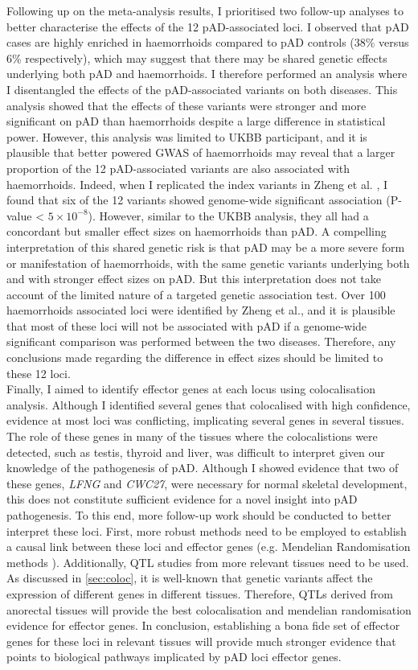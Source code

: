 Following up on the meta-analysis results, I prioritised two follow-up analyses to better characterise the effects of the 12 pAD-associated loci. I observed that pAD cases are highly enriched in haemorrhoids compared to pAD controls (38\% versus 6\% respectively), which may suggest that there may be shared genetic effects underlying both pAD and haemorrhoids. I therefore performed an analysis where I disentangled the effects of the pAD-associated variants on both diseases. This analysis showed that the effects of these variants were stronger and more significant on pAD than haemorrhoids despite a large difference in statistical power. However, this analysis was limited to UKBB participant, and it is plausible that better powered GWAS of haemorrhoids may reveal that a larger proportion of the 12 pAD-associated variants are also associated with haemorrhoids. Indeed, when I replicated the index variants in Zheng et al. \cite{Zheng2021-ss}, I found that six of the 12 variants showed genome-wide significant association (P-value < $5\times10^{-8}$). However, similar to the UKBB analysis, they all had a concordant but smaller effect sizes on haemorrhoids than pAD. A compelling interpretation of this shared genetic risk is that pAD may be a more severe form or manifestation of haemorrhoids, with the same genetic variants underlying both and with stronger effect sizes on pAD. But this interpretation does not take account of the limited nature of a targeted genetic association test. Over 100 haemorrhoids associated loci were identified by Zheng et al., and it is plausible that most of these loci will not be associated with pAD if a genome-wide significant comparison was performed between the two diseases. Therefore, any conclusions made regarding the difference in effect sizes should be limited to these 12 loci.\\

Finally, I aimed to identify effector genes at each locus using colocalisation analysis. Although I identified several genes that colocalised with high confidence, evidence at most loci was conflicting, implicating several genes in several tissues. The role of these genes in many of the tissues where the colocalistions were detected, such as testis, thyroid and liver, was difficult to interpret given our knowledge of the pathogenesis of pAD. Although I showed evidence that two of these genes, \textit{LFNG} and \textit{CWC27}, were necessary for normal skeletal development, this does not constitute sufficient evidence for a novel insight into pAD pathogenesis. To this end, more follow-up work should be conducted to better interpret these loci. First, more robust methods need to be employed to establish a causal link between these loci and effector genes (e.g. Mendelian Randomisation methods \cite{Sanderson2022-nm}). Additionally, QTL studies from more relevant tissues need to be used. As discussed in \ref{sec:coloc}, it is well-known that genetic variants affect the expression of different genes in different tissues. Therefore, QTLs derived from anorectal tissues will provide the best colocalisation and mendelian randomisation evidence for effector genes. In conclusion, establishing a bona fide set of effector genes for these loci in relevant tissues will provide much stronger evidence that points to biological pathways implicated by pAD loci effector genes. 
